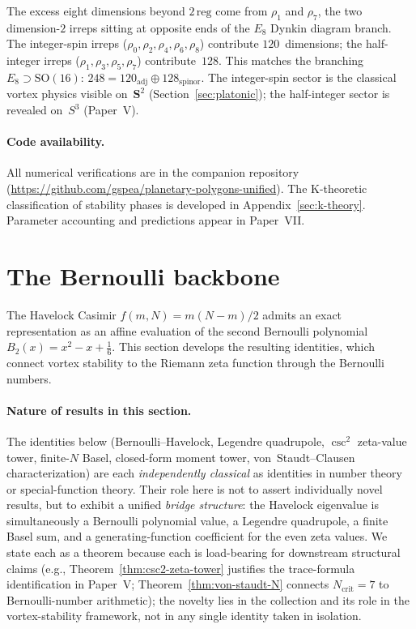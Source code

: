 The excess eight dimensions beyond $2\,\mathrm{reg}$ come from
$\rho_1$ and $\rho_7$, the two dimension-$2$ irreps sitting at
opposite ends of the $E_8$ Dynkin diagram branch.
The integer-spin irreps ($\rho_0, \rho_2, \rho_4, \rho_6, \rho_8$)
contribute $120$~dimensions; the half-integer irreps
($\rho_1, \rho_3, \rho_5, \rho_7$) contribute~$128$.
This matches the branching $E_8 \supset \mathrm{SO}(16)$:
$248 = 120_{\mathrm{adj}} \oplus 128_{\mathrm{spinor}}$.
The integer-spin sector is the classical vortex physics visible
on~$\mathbf{S}^2$ (Section~\ref{sec:platonic}); the half-integer
sector is revealed on~$S^3$ (Paper~V).

\paragraph{Code availability.}
All numerical verifications are in the companion repository
(\url{https://github.com/gspea/planetary-polygons-unified}).
The K-theoretic classification of stability phases is developed
in Appendix~\ref{sec:k-theory}.
Parameter accounting and predictions appear in Paper~VII.

\section{The Bernoulli backbone}
\label{sec:bernoulli-backbone}

The Havelock Casimir $f(m,N) = m(N{-}m)/2$ admits an exact
representation as an affine evaluation of the second Bernoulli
polynomial $B_2(x) = x^2 - x + \tfrac{1}{6}$.
This section develops the resulting identities,
which connect vortex stability to the Riemann zeta function
through the Bernoulli numbers.

\paragraph{Nature of results in this section.}
The identities below (Bernoulli--Havelock, Legendre quadrupole,
$\csc^2$ zeta-value tower, finite-$N$ Basel, closed-form moment
tower, von~Staudt--Clausen characterization) are each
\emph{independently classical} as identities in number theory
or special-function theory.  Their role here is not to assert
individually novel results, but to exhibit a unified
\emph{bridge structure}: the Havelock eigenvalue is
simultaneously a Bernoulli polynomial value, a Legendre
quadrupole, a finite Basel sum, and a generating-function
coefficient for the even zeta values.  We state each as a
theorem because each is load-bearing for downstream structural
claims (e.g., Theorem~\ref{thm:csc2-zeta-tower} justifies the
trace-formula identification in Paper~V; Theorem~\ref{thm:von-staudt-N}
connects $N_{\mathrm{crit}} = 7$ to Bernoulli-number arithmetic);
the novelty lies in the collection and its role in the
vortex-stability framework, not in any single identity taken
in isolation.

